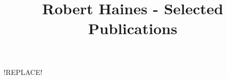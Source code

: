 \documentclass[11pt,a4paper]{article}
\begin{document}
\title{\Huge{Robert Haines - Selected Publications}}
\author{}
\date{}

\maketitle



\begin{enumerate}[{[}1{]} ]
  \item !REPLACE!
\end{enumerate}
\end{document}
